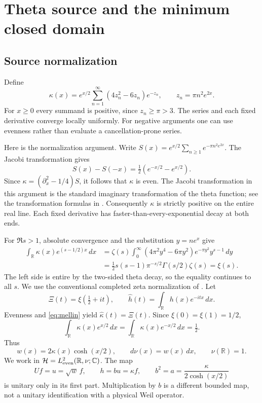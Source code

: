 \documentclass[11pt,a4paper]{article}
\numberwithin{equation}{section}
\theoremstyle{definition}\newtheorem{definition}[theorem]{Definition}
\theoremstyle{remark}\newtheorem{remark}[theorem]{Remark}
\newcommand{\HH}{\mathcal H}
\newcommand{\R}{\mathbb R}
\newcommand{\C}{\mathbb C}
\begin{document}
\section{Theta source and the minimum closed domain}\label{sec:domain}
\subsection{Source normalization}
Define
\begin{equation}\label{eq:kappa}
 \kappa(x)=e^{x/2}\sum_{n=1}^{\infty}(4z_n^2-6z_n)e^{-z_n},
 \qquad z_n=\pi n^2e^{2x}.
\end{equation}
For $x\ge0$ every summand is positive, since $z_n\ge\pi>3$. The series and each fixed derivative converge locally uniformly. For negative arguments one can use evenness rather than evaluate a cancellation-prone series.

Here is the normalization argument. Write
$S(x)=e^{x/2}\sum_{n\ge1}e^{-\pi n^2e^{2x}}$. The Jacobi transformation gives
\[
 S(x)-S(-x)=\tfrac12(e^{-x/2}-e^{x/2}).
\]
Since $\kappa=(\partial_x^2-1/4)S$, it follows that $\kappa$ is even. The Jacobi transformation in this argument is the standard imaginary transformation of the theta function; see the transformation formulas in \cite{nisttheta}. Consequently $\kappa$ is strictly positive on the entire real line. Each fixed derivative has faster-than-every-exponential decay at both ends.

For $\Re s>1$, absolute convergence and the substitution $y=ne^x$ give
\begin{align}
 \int_{\R}\kappa(x)e^{(s-1/2)x}\,dx
 &=\zeta(s)\int_0^\infty(4\pi^2y^4-6\pi y^2)e^{-\pi y^2}y^{s-1}\,dy\\
 &=\tfrac12s(s-1)\pi^{-s/2}\Gamma(s/2)\zeta(s)=\xi(s).
 \label{eq:mellin}
\end{align}
The left side is entire by the two-sided theta decay, so the equality continues to all $s$. We use the conventional completed zeta normalization of \cite{nistzeta}. Let
\begin{equation}
 \Xi(t)=\xi(\tfrac12+it),\qquad
 \widehat h(t)=\int_{\R}h(x)e^{-itx}\,dx.
\end{equation}
Evenness and \eqref{eq:mellin} yield $\widehat\kappa(t)=\Xi(t)$. Since $\xi(0)=\xi(1)=1/2$,
\begin{equation}\label{eq:normalization}
 \int_{\R}\kappa(x)e^{x/2}\,dx
 =\int_{\R}\kappa(x)e^{-x/2}\,dx=\tfrac12.
\end{equation}
Thus
\begin{equation}\label{eq:measure}
 w(x)=2\kappa(x)\cosh(x/2),\qquad d\nu(x)=w(x)\,dx,
 \qquad \nu(\R)=1.
\end{equation}
We work in $\HH=L^2_{\rm even}(\R,\nu;\C)$. The map
\begin{equation}\label{eq:coordinates}
 Uf=u=\sqrt w\,f,\qquad h=bu=\kappa f,
 \qquad b^2=a=\frac{\kappa}{2\cosh(x/2)}
\end{equation}
is unitary only in its first part. Multiplication by $b$ is a different bounded map, not a unitary identification with a physical Weil operator.
\end{document}
